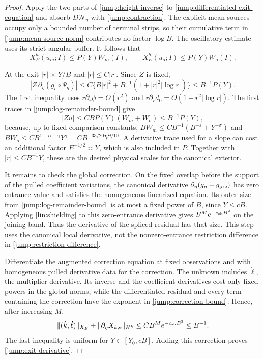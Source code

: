 \begin{proof}
Apply the two parts of \cref{jump:height-inverse} to
\eqref{jump:differentiated-exit-equation} and absorb
$D\mathcal N_\eta$ with \eqref{jump:contraction}.
The explicit mean sources occupy only a bounded number of
terminal strips, so their cumulative term in
\eqref{jump:mean-source-norm} contributes no factor $\log B$.
The oscillatory estimate uses its strict angular buffer.
It follows that
\begin{equation}\label{jump:log-remainder-bound}
 X_E^h(\dot u_m;I)\leq P(Y)W_m(I),\qquad
 X_E^h(\dot u_o;I)\leq P(Y)W_o(I).
\end{equation}

At the exit $|r|\asymp Y/B$ and $|\dot r|\leq C|r|$.  Since
$Z$ is fixed,
\[
 |Z\,\partial_\eta(g_c\circ\Psi_\eta)|
 \leq C\{B|r|^2+B^{-1}(1+|r|^2|\log r|)\}
 \leq B^{-1}P(Y).
\]
The first inequality uses
$r\partial_r\phi=O(r^2)$ and
$r\partial_rd_0=O(1+r^2|\log r|)$.
The first traces in \eqref{jump:log-remainder-bound} give
\[
 |Z\dot u|\leq CBP(Y)(W_m+W_o)
 \leq B^{-1}P(Y),
\]
because, up to fixed comparison constants,
$BW_m\leq CB^{-1}(B^{-\varepsilon}+Y^{-\sigma})$
and
$BW_o\leq CB^{1-\alpha-\gamma}Y^\gamma
       =CB^{-33/20}Y^{9/10}$.
A derivative trace used for a slope can cost an additional
factor $E^{-1/2}\asymp Y$, which is also included in $P$.
Together with $|\dot r|\leq CB^{-1}Y$, these are the desired
physical scales for the canonical exterior.

It remains to check the global correction.  On the fixed overlap
before the support of the pulled coefficient variations, the
canonical derivative
$\partial_\eta(g_\eta-g_{\rm pre})$ has zero entrance value and
satisfies the homogeneous linearized equation.  Its outer size
from \eqref{jump:log-remainder-bound} is at most a fixed power
of $B$, since $Y\leq cB$.  Applying \cref{lin:shielding} to
this zero-entrance derivative gives
$B^M e^{-c_{\rm sh}B^2}$ on the joining band.  Thus the derivative
of the spliced residual has that size.  This step uses the
canonical local derivative, not the nonzero-entrance
restriction difference in \eqref{jump:restriction-difference}.

Differentiate the augmented correction equation at fixed
observations and with homogeneous pulled derivative data for
the correction.  The unknown includes $\dot\ell$, the multiplier
derivative.  Its inverse and the coefficient derivatives cost
only fixed powers in the global norms, while the differentiated
residual and every term containing the correction have the
exponent in \eqref{jump:correction-bound}.  Hence, after
increasing $M$,
\[
 \|(\dot k,\dot\ell)\|_{X_B}
       +\|\partial_\eta X_{k,{\rm e}}\|_{H^h}
       \leq CB^M e^{-c_{\rm sh}B^2}\leq B^{-1}.
\]
The last inequality is uniform for $Y\in[Y_0,cB]$.
Adding this correction proves \eqref{jump:exit-derivative}.
\end{proof}

